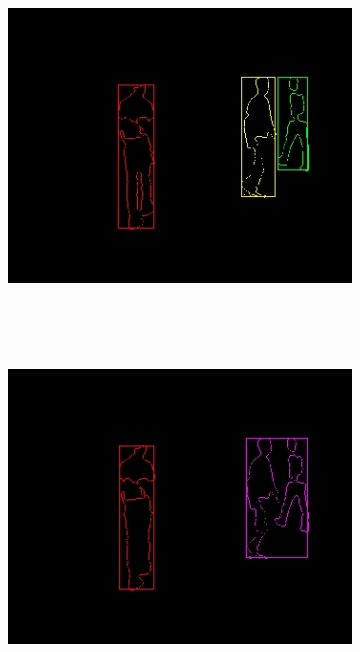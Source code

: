 \begin{figure}[t]
        \centering
        \begin{subfigure}[b]{0.32\textwidth}
                \centering
                \caption{~}
                \includegraphics[width=\textwidth]{fig1.jpg}
                \label{fig:cp02_cluster1}
        \end{subfigure}%
        ~ %
        \begin{subfigure}[b]{0.32\textwidth}
                \centering
		\caption{~}
                \includegraphics[width=\textwidth]{fig2.jpg}

\end{subfigure}
\end{figure}
